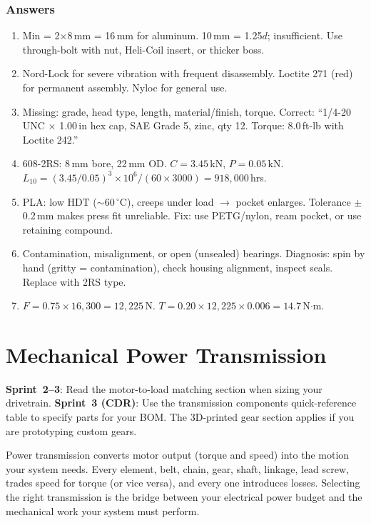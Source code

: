 \documentclass[11pt,letterpaper,twoside,openany]{book}
\newcommand{\degC}{\ensuremath{{}^{\circ}\text{C}}}
\begin{document}
\subsection{Answers}
\begin{enumerate}[leftmargin=1.5em]
\item Min = 2$\times$8\,mm = 16\,mm for aluminum. 10\,mm = 1.25$d$; insufficient. Use through-bolt with nut, Heli-Coil insert, or thicker boss.
\item Nord-Lock for severe vibration with frequent disassembly. Loctite 271 (red) for permanent assembly. Nyloc for general use.
\item Missing: grade, head type, length, material/finish, torque. Correct: ``1/4-20 UNC $\times$ 1.00\,in hex cap, SAE Grade 5, zinc, qty 12. Torque: 8.0\,ft-lb with Loctite 242.''
\item 608-2RS: 8\,mm bore, 22\,mm OD. $C = 3.45$\,kN, $P = 0.05$\,kN. $L_{10} = (3.45/0.05)^3 \times 10^6/(60 \times 3000) = 918{,}000$\,hrs.
\item PLA: low HDT ($\sim$60\,\degC{}), creeps under load $\to$ pocket enlarges. Tolerance $\pm$0.2\,mm makes press fit unreliable. Fix: use PETG/nylon, ream pocket, or use retaining compound.
\item Contamination, misalignment, or open (unsealed) bearings. Diagnosis: spin by hand (gritty = contamination), check housing alignment, inspect seals. Replace with 2RS type.
\item $F = 0.75 \times 16{,}300 = 12{,}225$\,N. $T = 0.20 \times 12{,}225 \times 0.006 = 14.7$\,N$\cdot$m.
\end{enumerate}


\chapter{Mechanical Power Transmission}\label{ch:transmission}

\begin{tipbox}
\textbf{Sprint~2--3}: Read the motor-to-load matching section when sizing your drivetrain. \textbf{Sprint~3 (CDR)}: Use the transmission components quick-reference table to specify parts for your BOM. The 3D-printed gear section applies if you are prototyping custom gears.
\end{tipbox}


\vspace{1em}

Power transmission converts motor output (torque and speed) into the motion your system needs. Every element, belt, chain, gear, shaft, linkage, lead screw, trades speed for torque (or vice versa), and every one introduces losses. Selecting the right transmission is the bridge between your electrical power budget and the mechanical work your system must perform.
\end{document}

